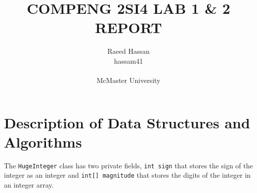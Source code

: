 \documentclass[12pt]{article}
\title{COMPENG 2SI4 LAB 1 \& 2 REPORT}
\author{Raeed Hassan \\ hassam41 \\  \\ McMaster University}
\newcommand{\code}[1]{\texttt{#1}}
\begin{document}
\maketitle
\pagebreak

\section*{Description of Data Structures and Algorithms}
The \code{HugeInteger} class has two private fields, \code{int sign} that stores the sign of the integer as an integer and \code{int[] magnitude} that stores the digits of the integer in an integer array.
\end{document}
